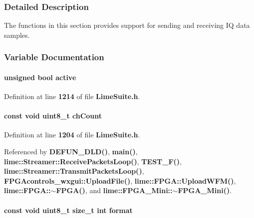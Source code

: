 \subsubsection{Detailed Description}
The functions in this section provides support for sending and receiving IQ data samples. 



\subsubsection{Variable Documentation}
\paragraph[{active}]{\setlength{\rightskip}{0pt plus 5cm}unsigned bool active}\label{group__FN__STREAM_ga44af5b3ba9277b57c8c05926b7a2b5cb}


Definition at line {\bf 1214} of file {\bf Lime\+Suite.\+h}.

\paragraph[{ch\+Count}]{\setlength{\rightskip}{0pt plus 5cm}const {\bf void} uint8\+\_\+t ch\+Count}\label{group__FN__STREAM_ga3c63a4089587cf189d87730ef2bf7402}


Definition at line {\bf 1204} of file {\bf Lime\+Suite.\+h}.



Referenced by {\bf D\+E\+F\+U\+N\+\_\+\+D\+L\+D()}, {\bf main()}, {\bf lime\+::\+Streamer\+::\+Receive\+Packets\+Loop()}, {\bf T\+E\+S\+T\+\_\+\+F()}, {\bf lime\+::\+Streamer\+::\+Transmit\+Packets\+Loop()}, {\bf F\+P\+G\+Acontrols\+\_\+wxgui\+::\+Upload\+File()}, {\bf lime\+::\+F\+P\+G\+A\+::\+Upload\+W\+F\+M()}, {\bf lime\+::\+F\+P\+G\+A\+::$\sim$\+F\+P\+G\+A()}, and {\bf lime\+::\+F\+P\+G\+A\+\_\+\+Mini\+::$\sim$\+F\+P\+G\+A\+\_\+\+Mini()}.

\paragraph[{format}]{\setlength{\rightskip}{0pt plus 5cm}const {\bf void} uint8\+\_\+t size\+\_\+t {\bf int} format}\label{group__FN__STREAM_gaad9b08c92854f938d313c29fd0022e5d}


